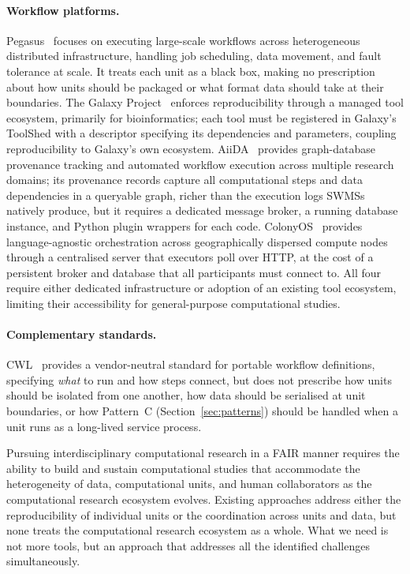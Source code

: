 \documentclass{eceasst}
\begin{document}
\paragraph{Workflow platforms.}
Pegasus~\cite{deelman2015pegasus} focuses on executing large-scale workflows
across heterogeneous distributed infrastructure, handling job scheduling, data
movement, and fault tolerance at scale. It treats each unit as a black box,
making no prescription about how units should be packaged or what format data
should take at their boundaries. The Galaxy Project~\cite{galaxycommunity2024galaxy}
enforces reproducibility through a managed tool ecosystem, primarily for
bioinformatics; each tool must be registered in Galaxy's ToolShed with a
descriptor specifying its dependencies and parameters, coupling reproducibility
to Galaxy's own ecosystem. AiiDA~\cite{huber2020aiida} provides graph-database
provenance tracking and automated workflow execution across multiple research
domains; its provenance records capture all computational steps and data dependencies
in a queryable graph, richer than the execution logs SWMSs natively produce, but
it requires a dedicated message broker, a running database instance, and Python
plugin wrappers for each code. ColonyOS~\cite{kristiansson2025colonyos} provides
language-agnostic orchestration across geographically dispersed compute nodes
through a centralised server that executors poll over HTTP, at the cost of a
persistent broker and database that all participants must connect to. All four require either dedicated infrastructure or adoption of an existing
tool ecosystem, limiting their accessibility for general-purpose computational
studies.

\paragraph{Complementary standards.}
CWL~\cite{crusoe2022cwl} provides a vendor-neutral standard for portable
workflow definitions, specifying \emph{what} to run and how steps connect, but
does not prescribe how units should be isolated from one another, how data
should be serialised at unit boundaries, or how Pattern~C
(Section~\ref{sec:patterns}) should be handled when a unit runs as a long-lived
service process.

\medskip
Pursuing interdisciplinary computational research in a FAIR manner requires the
ability to build and sustain computational studies that accommodate the
heterogeneity of data, computational units, and human collaborators as the
computational research ecosystem evolves. Existing approaches address either the reproducibility of individual units or
the coordination across units and data, but none treats the computational
research ecosystem as a whole. What we need is not more tools, but an approach
that addresses all the identified challenges simultaneously.
\end{document}
